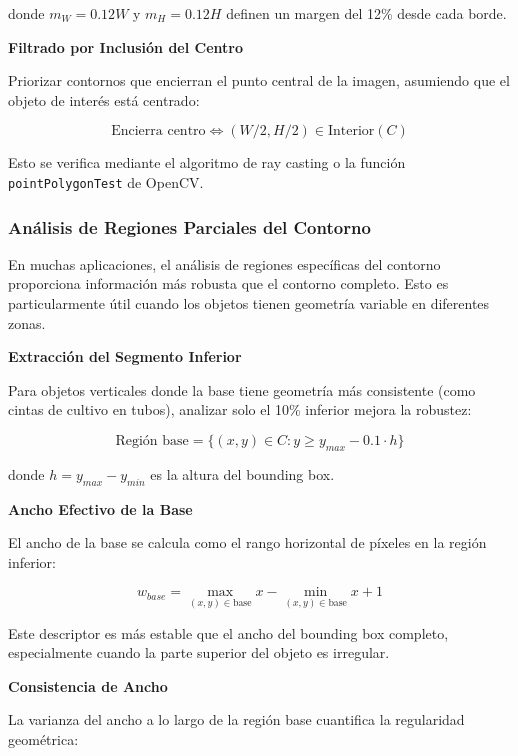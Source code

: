 donde $m_W = 0.12W$ y $m_H = 0.12H$ definen un margen del 12\% desde cada borde.

\textbf{Filtrado por Inclusión del Centro}

Priorizar contornos que encierran el punto central de la imagen, asumiendo que el objeto de interés está centrado:

\begin{equation}
\text{Encierra centro} \Leftrightarrow (W/2, H/2) \in \text{Interior}(C)
\end{equation}

Esto se verifica mediante el algoritmo de ray casting o la función \texttt{pointPolygonTest} de OpenCV.

\subsubsection{Análisis de Regiones Parciales del Contorno}

En muchas aplicaciones, el análisis de regiones específicas del contorno proporciona información más robusta que el contorno completo. Esto es particularmente útil cuando los objetos tienen geometría variable en diferentes zonas.

\textbf{Extracción del Segmento Inferior}

Para objetos verticales donde la base tiene geometría más consistente (como cintas de cultivo en tubos), analizar solo el 10\% inferior mejora la robustez:

\begin{equation}
\text{Región base} = \{(x,y) \in C : y \geq y_{max} - 0.1 \cdot h\}
\end{equation}

donde $h = y_{max} - y_{min}$ es la altura del bounding box.

\textbf{Ancho Efectivo de la Base}

El ancho de la base se calcula como el rango horizontal de píxeles en la región inferior:

\begin{equation}
w_{base} = \max_{(x,y) \in \text{base}} x - \min_{(x,y) \in \text{base}} x + 1
\end{equation}

Este descriptor es más estable que el ancho del bounding box completo, especialmente cuando la parte superior del objeto es irregular.

\textbf{Consistencia de Ancho}

La varianza del ancho a lo largo de la región base cuantifica la regularidad geométrica:


